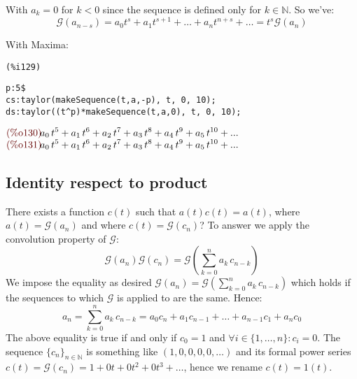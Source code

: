 With $a_k = 0$ for $k < 0$ since the sequence is defined only for $k
\in \mathbb{N} $. So we've:
\begin{displaymath}
  \mathcal{G} (a_{n-s}) =  a_0 t^s +
  a_1 t^{s+1} + \ldots + a_n t^{n+s} + \ldots = t^s \mathcal{G} (a_n)
\end{displaymath}

With Maxima:

\noindent
\begin{minipage}[t]{8ex}{\color{red}\bf
\begin{verbatim}
(%i129)
\end{verbatim}}
\end{minipage}
\begin{minipage}[t]{\textwidth}{\color{blue}
\begin{verbatim}
p:5$
cs:taylor(makeSequence(t,a,-p), t, 0, 10);
ds:taylor((t^p)*makeSequence(t,a,0), t, 0, 10);
\end{verbatim}}
\end{minipage}
\begin{math}\displaystyle
\parbox{8ex}{\color{labelcolor}(\%o130) }
{a}_{0}\,{t}^{5}+{a}_{1}\,{t}^{6}+{a}_{2}\,{t}^{7}+{a}_{3}\,{t}^{8}+{a}_{4}\,{t}^{9}+{a}_{5}\,{t}^{10}+...
\end{math}\\
\begin{math}\displaystyle
  \parbox{8ex}{\color{labelcolor}(\%o131) }
  {a}_{0}\,{t}^{5}+{a}_{1}\,{t}^{6}+{a}_{2}\,{t}^{7}+{a}_{3}\,{t}^{8}+{a}_{4}\,{t}^{9}+{a}_{5}\,{t}^{10}+...
\end{math}


\subsection{Identity respect to product}

There exists a function $c(t)$ such that $a(t)c(t)=a(t)$, where $a(t)
= \mathcal{G} (a_n)$ and where $c(t) = \mathcal{G} (c_n)$? To answer
we apply the convolution property of $\mathcal{G} $:
\begin{displaymath}
  \mathcal{G} (a_n)\mathcal{G} (c_n) = \mathcal{G}\left(
    \sum_{k=0}^{n}{a}_{k}\,{c}_{n-k}\right)
\end{displaymath}
We impose the equality as desired $\mathcal{G} (a_n) = \mathcal{G}\left(
  \sum_{k=0}^{n}{a}_{k}\,{c}_{n-k}\right)$ which holds if the
sequences to which $\mathcal{G} $ is applied to are the same. Hence:
\begin{displaymath}
  a_n = \sum_{k=0}^{n}{a}_{k}\,{c}_{n-k} = a_0 c_n + a_1 c_{n-1} +
  \ldots + a_{n-1} c_1 + a_n c_0
\end{displaymath}
The above equality is true if and only if $c_0 = 1$ and $\forall
i\in\{1,\ldots,n\}:c_i = 0$. The sequence $\{c_n\}_{n\in \mathbb{N} }$
is something like $(1,0,0,0,0,\ldots)$ and its formal power series
$c(t) = \mathcal{G}(c_n) = 1 + 0t + 0t^2 + 0t^3 + \ldots $, hence we
rename $c(t) = 1(t)$.

